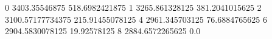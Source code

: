 0 3403.35546875 518.6982421875
1 3265.861328125 381.2041015625
2 3100.57177734375 215.91455078125
4 2961.345703125 76.6884765625
6 2904.5830078125 19.92578125
8 2884.6572265625 0.0
